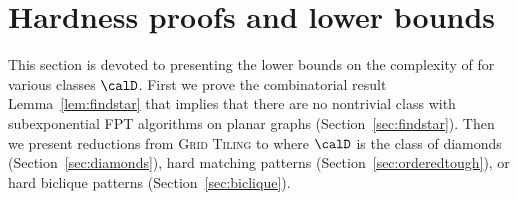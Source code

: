 \section{Hardness proofs and lower bounds}\label{sec:lower}

This section is devoted to presenting the lower bounds on the complexity of \Dsn for various classes $\calD$. First we prove the combinatorial result Lemma~\ref{lem:findstar} that implies that there are no nontrivial class with subexponential FPT algorithms on planar graphs (Section~\ref{sec:findstar}). Then we present reductions from \textsc{Grid Tiling} to \Dsn where $\calD$ is the class of diamonds (Section~\ref{sec:diamonds}), hard matching patterns (Section~\ref{sec:orderedtough}), or hard biclique patterns (Section~\ref{sec:biclique}).



